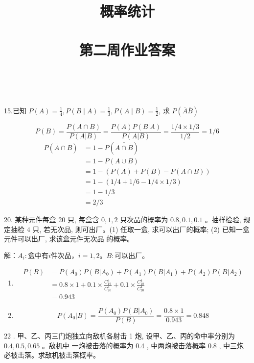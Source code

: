 \documentclass[14pt]{scrartcl} %
\title{	
	\normalfont \huge
	\textsc{概率统计} \\ [25pt] %
	\horrule{0.5pt} \\[0.4cm] %
	\huge 第二周作业答案 \\ %
	\horrule{0.5pt} \\[0.4cm] %
	\date{}
}
\numberwithin{equation}{section} %
\numberwithin{figure}{section} %
\numberwithin{table}{section} %
\begin{document}
	\maketitle %
	15.已知 $P(A)=\frac{1}{4}, P(B \mid A)=\frac{1}{3}, P(A \mid B)=\frac{1}{2}$, 求 $P(\bar{A} \bar{B})$ 
	
	\vspace*{1cm}
	\[
	P(B) = \frac{P(A \cap B)}{P(A | B)} = \frac{P(A) P(B | A)}{P(A | B)} = \frac{1 / 4 \times 1 / 3}{1 / 2} = 1 / 6
	\]
	\begin{align}
		P(\bar{A} \cap \bar{B}) & = 1 - P(\overline{\bar{A} \cap \bar{B}}) \\
		& = 1 - P(A \cup B) \\
		& = 1 - (P(A) + P(B) - P(A \cap B)) \\
		& = 1 - (1 / 4 + 1 / 6 - 1 / 4 \times 1 / 3) \\
		& = 1 - 1 / 3 \\
		& = 2 / 3
	\end{align}
	
	\vspace{1cm}
	
	20. 某种元件每盒 20 只, 每盒含 $0,1,2$ 只次品的概率为 $0.8,0.1,0.1$ 。抽样检验, 规定抽检 4 只, 若无次品, 则可出厂。(1) 任取一盒, 求可以出厂的概率; (2) 已知一盒元件可以出厂, 求该盒元件无次品 的概率。
	
	\vspace*{1cm}
	解：$A_i:$盒中有$i$件次品，$i = 1, 2$。$B:$可以出厂。
	\begin{enumerate}[(1)]
		\item
		\begin{align}
			P(B) & = P(A_0)P(B | A_0) + P(A_1)P(B | A_1) + P(A_2)P(B | A_2) \\
			& = 0.8 \times 1 + 0.1 \times \frac{C_{19}^4}{C_{20}^4} + 0.1 \times\frac{C_{18}^4}{C_{20}^4} \\
			& = 0.943
		\end{align}
		\item 
		\[P(A_0 | B) = \frac{P(A_0)P(B | A_0)}{P(B)} = \frac{0.8 \times 1}{0.943} = 0.848\]
	\end{enumerate}
	
	\vspace*{1cm}
	22 . 甲、乙、丙三门炮独立向敌机各射击 1 炮, 设甲、乙、丙的命中率分别为 $0.4,0.5,0.65$ 。敌机中 一炮被击落的概率为 0.4 , 中两炮被击落概率 0.8 , 中三炮必被击落。求敌机被击落概率。
	
\end{document}

